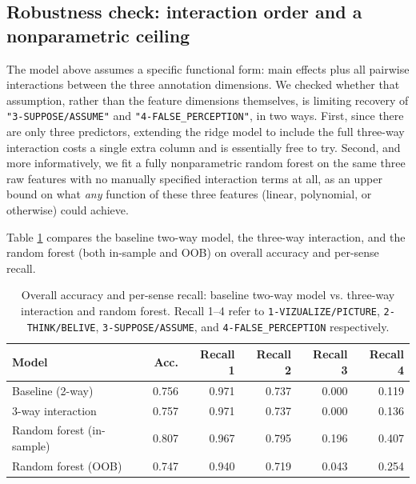 \documentclass[
]{article}
\begin{document}
\subsection{Robustness check: interaction order and a nonparametric
ceiling}\label{robustness-check-interaction-order-and-a-nonparametric-ceiling}

The model above assumes a specific functional form: main effects plus
all pairwise interactions between the three annotation dimensions. We
checked whether that assumption, rather than the feature dimensions
themselves, is limiting recovery of \texttt{"3-SUPPOSE/ASSUME"} and
\texttt{"4-FALSE\_PERCEPTION"}, in two ways. First, since there are only
three predictors, extending the ridge model to include the full
three-way interaction costs a single extra column and is essentially
free to try. Second, and more informatively, we fit a fully
nonparametric random forest on the same three raw features with no
manually specified interaction terms at all, as an upper bound on what
\emph{any} function of these three features (linear, polynomial, or
otherwise) could achieve.

Table \ref{tab:interactionComparison} compares the baseline two-way
model, the three-way interaction, and the random forest (both in-sample
and OOB) on overall accuracy and per-sense recall.

\begin{table}[H]
\centering
\caption{\label{tab:unnamed-chunk-23}Overall accuracy and per-sense recall: baseline two-way model vs. three-way interaction and random forest. Recall 1--4 refer to \texttt{1-VIZUALIZE/PICTURE}, \texttt{2-THINK/BELIVE}, \texttt{3-SUPPOSE/ASSUME}, and \texttt{4-FALSE\_PERCEPTION} respectively.\label{tab:interactionComparison}}
\centering
\fontsize{9}{11}\selectfont
\begin{tabular}[t]{lrrrrr}
\toprule
Model & Acc. & Recall 1 & Recall 2 & Recall 3 & Recall 4\\
\midrule
Baseline (2-way) & 0.756 & 0.971 & 0.737 & 0.000 & 0.119\\
3-way interaction & 0.757 & 0.971 & 0.737 & 0.000 & 0.136\\
Random forest (in-sample) & 0.807 & 0.967 & 0.795 & 0.196 & 0.407\\
Random forest (OOB) & 0.747 & 0.940 & 0.719 & 0.043 & 0.254\\
\bottomrule
\end{tabular}
\end{table}
\end{document}
